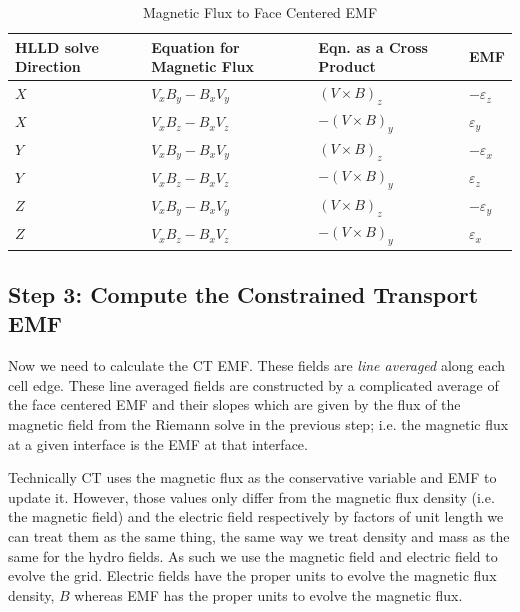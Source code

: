 \begin{table}[!ht]
    \centering
        \caption{Magnetic Flux to Face Centered EMF}
    \begin{tabular}{|l|l|l|l|}
    \hline
        HLLD solve Direction & Equation for Magnetic Flux & Eqn. as a Cross Product & EMF \\ \hline
        $ X $ & $ V_x B_y - B_x V_y $ & $  (V \times B)_z $ & $ -\varepsilon_z $ \\ \hline
        $ X $ & $ V_x B_z - B_x V_z $ & $ -(V \times B)_y $ & $  \varepsilon_y $ \\ \hline
        $ Y $ & $ V_x B_y - B_x V_y $ & $  (V \times B)_z $ & $ -\varepsilon_x $ \\ \hline
        $ Y $ & $ V_x B_z - B_x V_z $ & $ -(V \times B)_y $ & $  \varepsilon_z $ \\ \hline
        $ Z $ & $ V_x B_y - B_x V_y $ & $  (V \times B)_z $ & $ -\varepsilon_y $ \\ \hline
        $ Z $ & $ V_x B_z - B_x V_z $ & $ -(V \times B)_y $ & $  \varepsilon_x $ \\ \hline
    \end{tabular}
    \label{table:emf}
\end{table}

\subsection{Step 3: Compute the Constrained Transport EMF}
\label{vlct:emf}

Now we need to calculate the CT EMF. These fields are \emph{line averaged} along each cell edge. These line averaged fields are constructed by a complicated average of the face centered EMF and their slopes which are given by the flux of the magnetic field from the Riemann solve in the previous step; i.e. the magnetic flux at a given interface is the EMF at that interface.

Technically CT uses the magnetic flux as the conservative variable and EMF to update it. However, those values only differ from the magnetic flux density (i.e. the magnetic field) and the electric field respectively by factors of unit length we can treat them as the same thing, the same way we treat density and mass as the same for the hydro fields\cite{stone_athena_2008}. As such we use the magnetic field and electric field to evolve the grid. Electric fields have the proper units to evolve the magnetic flux density, $ B $ whereas EMF has the proper units to evolve the magnetic flux.

